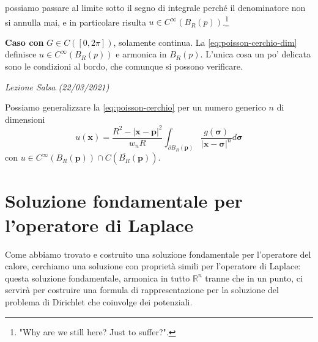 \documentclass[10pt,a4paper,twoside,openright]{book}
\newcommand{\x}{\mathbf{x}}
\newcounter{conteggioS}
\newcommand{\LezioneS}[1]{
	\stepcounter{conteggioS}
	\textit{Lezione Salsa \arabic{conteggioS} (#1)}
	}
\begin{document}
\begin{dimostrazione}
\begin{figure}[H]

\end{figure}
\FloatBarrier

possiamo passare al limite sotto il segno di integrale perché il denominatore non si annulla mai, e in particolare risulta $u\in C^{\infty }(B_{R}(p))$.\footnote{"Why are we still here? Just to suffer?".}

\textbf{Caso con }$G\in C([ 0,2\pi ])$, solamente continua. La \eqref{eq:poisson-cerchio-dim} definisce $u\in C^{\infty }(B_{R}(p))$ e armonica in $B_{R}(p)$. L'unica cosa un po' delicata sono le condizioni al bordo, che comunque si possono verificare.

\end{dimostrazione}

\LezioneS{22/03/2021}

Possiamo generalizzare la \eqref{eq:poisson-cerchio} per un numero generico $\displaystyle n$ di dimensioni
\begin{equation*}
	u(\x) =\frac{R^{2} -| \x -\mathbf{p}| ^{2}}{w_{n} R}\int _{\partial B_{R}(\mathbf{p})}\frac{g(\bm{\sigma })}{| \x -\bm{\sigma }| ^{n}} d\bm{\sigma }
\end{equation*}
con $\displaystyle u\in C^{\infty }( B_{R}(\mathbf{p})) \cap C\left(\overline{B_{R}}(\mathbf{p})\right)$.
\section{Soluzione fondamentale per l'operatore di Laplace}

Come abbiamo trovato e costruito una soluzione fondamentale per l'operatore del calore, cerchiamo una soluzione con proprietà simili per l'operatore di Laplace: questa soluzione fondamentale, armonica in tutto $\displaystyle \mathbb{R}^{n}$ tranne che in un punto, ci servirà per costruire una formula di rappresentazione per la soluzione del problema di Dirichlet che coinvolge dei potenziali.
\end{document}

